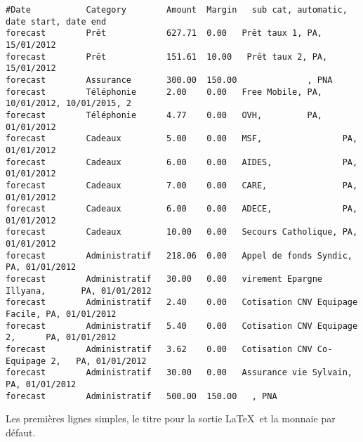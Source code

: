\linenumbers
\footnotesize
\begin{verbatim}
#Date           Category        Amount  Margin   sub cat, automatic, date start, date end
forecast        Prêt            627.71  0.00   Prêt taux 1, PA, 15/01/2012
forecast        Prêt            151.61  10.00   Prêt taux 2, PA, 15/01/2012
forecast        Assurance       300.00  150.00              , PNA
forecast        Téléphonie      2.00    0.00   Free Mobile, PA, 10/01/2012, 10/01/2015, 2
forecast        Téléphonie      4.77    0.00   OVH,         PA, 01/01/2012
forecast        Cadeaux         5.00    0.00   MSF,                PA, 01/01/2012
forecast        Cadeaux         6.00    0.00   AIDES,              PA, 01/01/2012
forecast        Cadeaux         7.00    0.00   CARE,               PA, 01/01/2012
forecast        Cadeaux         6.00    0.00   ADECE,              PA, 01/01/2012
forecast        Cadeaux         10.00   0.00   Secours Catholique, PA, 01/01/2012
forecast        Administratif   218.06  0.00   Appel de fonds Syndic,          PA, 01/01/2012
forecast        Administratif   30.00   0.00   virement Epargne Illyana,       PA, 01/01/2012
forecast        Administratif   2.40    0.00   Cotisation CNV Equipage Facile, PA, 01/01/2012
forecast        Administratif   5.40    0.00   Cotisation CNV Equipage 2,      PA, 01/01/2012
forecast        Administratif   3.62    0.00   Cotisation CNV Co-Equipage 2,   PA, 01/01/2012
forecast        Administratif   30.00   0.00   Assurance vie Sylvain,          PA, 01/01/2012
forecast        Administratif   500.00  150.00   , PNA
\end{verbatim}
\nolinenumbers
\normalsize

Les premières lignes simples, le titre pour la sortie \LaTeX\
et la monnaie par défaut.
